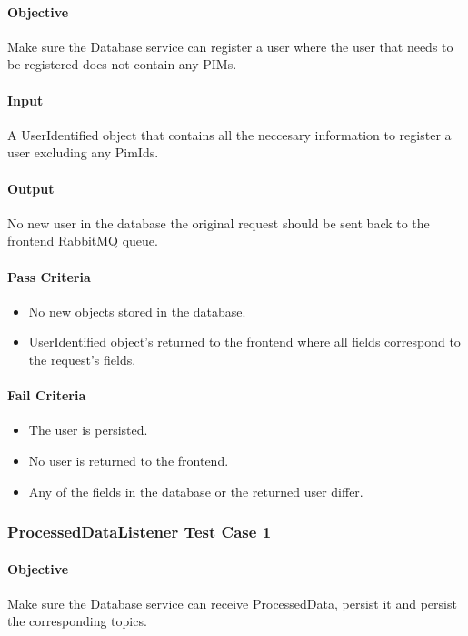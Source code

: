 \documentclass[hidelinks,english]{article}
\begin{document}
				\paragraph{Objective} Make sure the Database service can register a user where the user that needs to be registered does not contain any PIMs.
				\paragraph{Input} A UserIdentified object that contains all the neccesary information to register a user excluding any PimIds.
				\paragraph{Output} No new user in the database the original request should be sent back to the frontend RabbitMQ queue.
				\paragraph{Pass Criteria}
				\begin{itemize}
					\item No new objects stored in the database.
					\item UserIdentified object's returned to the frontend where all fields correspond to the request's fields.
				\end{itemize}
				\paragraph{Fail Criteria}
				\begin{itemize}
					\item The user is persisted.
					\item No user is returned to the frontend.
					\item Any of the fields in the database or the returned user differ.
				\end{itemize}
				
			\subsubsection{ProcessedDataListener Test Case 1}\label{databaseprocesseddatalistenertest1}
				\paragraph{Objective} Make sure the Database service can receive ProcessedData, persist it and persist the corresponding topics.
\end{document}
